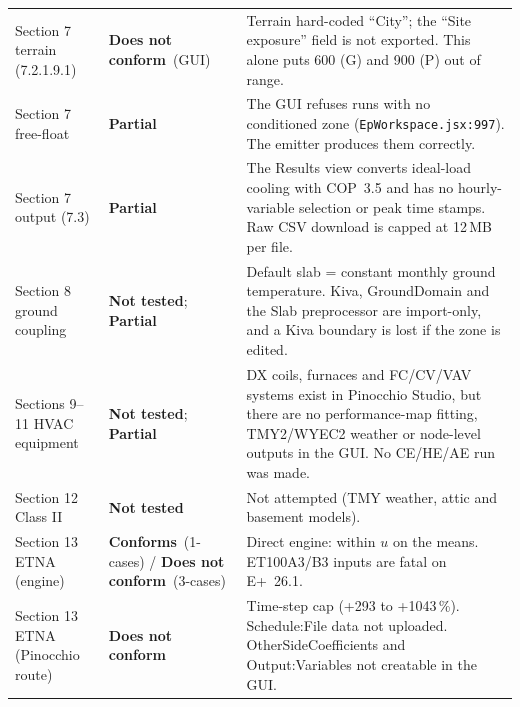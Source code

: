 \documentclass[10pt,a4paper]{article}
\newcommand{\OK}{\textcolor{ok}{\textbf{Conforms}}}
\newcommand{\NO}{\textcolor{bad}{\textbf{Does not conform}}}
\newcommand{\PART}{\textcolor{part}{\textbf{Partial}}}
\newcommand{\NT}{\textbf{Not tested}}
\newcommand{\code}[1]{\texttt{\small #1}}
\begin{document}
{\begin{longtable}{p{3.2cm}p{2.3cm}p{10.2cm}}
Section 7 terrain (7.2.1.9.1) & \NO\ (GUI) & Terrain hard-coded ``City''; the ``Site exposure'' field is not exported. This alone puts 600 (G) and 900 (P) out of range.\\
Section 7 free-float & \PART & The GUI refuses runs with no conditioned zone (\code{EpWorkspace.jsx:997}). The emitter produces them correctly.\\
Section 7 output (7.3) & \PART & The Results view converts ideal-load cooling with COP~3.5 and has no hourly-variable selection or peak time stamps. Raw CSV download is capped at 12\,MB per file.\\
Section 8 ground coupling & \NT; \PART & Default slab = constant monthly ground temperature. Kiva, GroundDomain and the Slab preprocessor are import-only, and a Kiva boundary is lost if the zone is edited.\\
Sections 9--11 HVAC equipment & \NT; \PART & DX coils, furnaces and FC/CV/VAV systems exist in Pinocchio Studio, but there are no performance-map fitting, TMY2/WYEC2 weather or node-level outputs in the GUI. No CE/HE/AE run was made.\\
Section 12 Class II & \NT & Not attempted (TMY weather, attic and basement models).\\
Section 13 ETNA (engine) & \OK\ (1-cases) / \NO\ (3-cases) & Direct engine: within $u$ on the means. ET100A3/B3 inputs are fatal on E+~26.1.\\
Section 13 ETNA (Pinocchio route) & \NO & Time-step cap (+293 to +1043\,\%). Schedule:File data not uploaded. OtherSideCoefficients and Output:Variables not creatable in the GUI.\\
\bottomrule
\end{longtable}}
\end{document}
